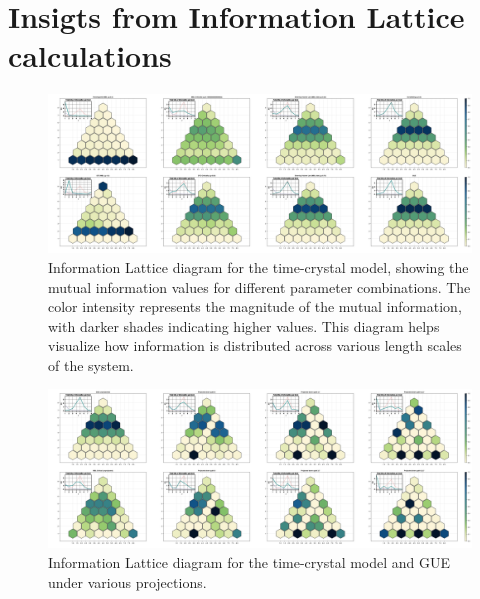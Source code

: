 \section{Insigts from Information Lattice calculations}

\begin{figure}[h]
    \centering
    \includegraphics[width=\textwidth]{.src/images/info_lattice_diagram_timecrystals.png}
    \caption{Information Lattice diagram for the time-crystal model, showing the mutual information values for different parameter combinations. The color intensity represents the magnitude of the mutual information, with darker shades indicating higher values. This diagram helps visualize how information is distributed across various length scales of the system.}
    \label{fig:info_lattice_diagram_timecrystals}
\end{figure}



\begin{figure}[h]
    \centering
    \includegraphics[width=\textwidth]{.src/images/info_lattice_diagram_projections.png}
    \caption{Information Lattice diagram for the time-crystal model and GUE under various projections.}
    \label{fig:info_lattice_diagram_projections}
\end{figure}